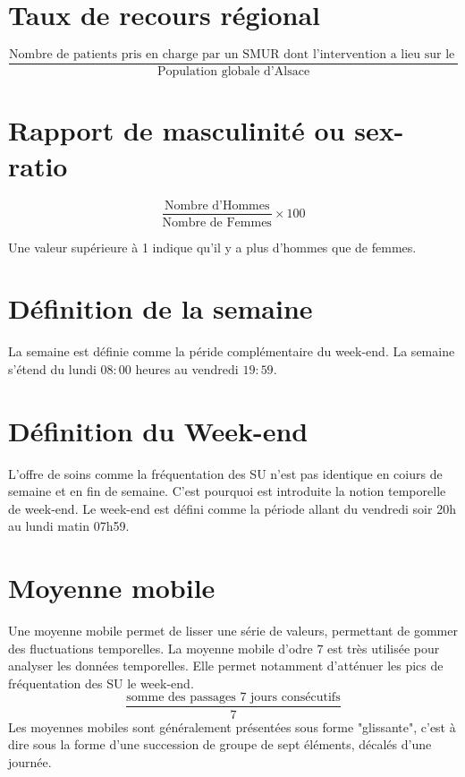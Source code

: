 \documentclass[12pt,english,french,twoside]{report}\usepackage[]{graphicx}\usepackage[]{color}
\begin{document}
\section*{Taux de recours régional}
\begin{displaymath}
    \frac{\text{Nombre de patients pris en charge par un SMUR dont l'intervention a lieu sur le territoire régional }}{\text{Population globale d'Alsace}}
  \end{displaymath}

\section*{Rapport de masculinité ou sex-ratio}
\begin{displaymath}
    \frac{\text{Nombre d'Hommes}}{\text{Nombre de Femmes}} \times 100
\end{displaymath}

Une valeur supérieure à 1 indique qu'il y a plus d'hommes que de femmes.

\section*{Définition de la semaine}
La semaine est définie comme la péride complémentaire du week-end. La semaine s'étend du lundi $08:00$ heures au vendredi $19:59$.

\section*{Définition du Week-end}
L'offre de soins comme la fréquentation des SU n'est pas identique en coiurs de semaine et en fin de semaine. C'est pourquoi est introduite la notion temporelle de week-end.
Le week-end est défini comme la période allant du vendredi soir 20h au lundi matin 07h59.

\section*{Moyenne mobile}
Une moyenne mobile permet de lisser une série de valeurs, permettant de gommer des fluctuations temporelles. La moyenne mobile d'odre $7$ est très utilisée pour analyser les données temporelles. Elle permet notamment d'atténuer les pics de fréquentation des SU le week-end.
\begin{displaymath}
    \frac{\text{somme des passages 7 jours consécutifs}}{7}
\end{displaymath}
Les moyennes mobiles sont généralement présentées sous forme "glissante", c'est à dire sous la forme d'une succession de groupe de sept éléments, décalés d'une journée.
\end{document}

